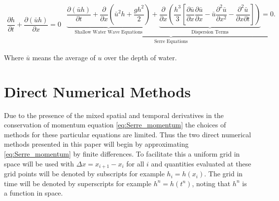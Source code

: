 \documentclass[SingleSpace,12pt,Proceedings]{Serre_ASCE}
\begin{document}
\begin{linenomath*}
\begin{subequations}\label{eq:Serre_nonconservative_form}
\begin{gather}
\dfrac{\partial h}{\partial t} + \dfrac{\partial (\bar{u}h)}{\partial x} = 0
\label{eq:Serre_continuity}
\end{gather}
\begin{gather}
\underbrace{\underbrace{\dfrac{\partial (\bar{u}h)}{\partial t} + \dfrac{\partial}{\partial x} \left ( \bar{u}^2h + \dfrac{gh^2}{2}\right )}_{\text{Shallow Water Wave Equations}} + \underbrace{\dfrac{\partial}{\partial x} \left (  \dfrac{h^3}{3} \left [ \dfrac{\partial \bar{u} }{\partial x} \dfrac{\partial \bar{u}}{\partial x} - \bar{u} \dfrac{\partial^2 \bar{u}}{\partial x^2}  - \dfrac{\partial^2 \bar{u}}{\partial x \partial t}\right ] \right )}_{\text{Dispersion Terms}} = 0.}_{\text{Serre Equations}}
\label{eq:Serre_momentum}
\end{gather}
\end{subequations}
\end{linenomath*}
Where $\bar{u}$ means the average of $u$ over the depth of water.
\section{Direct Numerical Methods}
Due to the presence of the mixed spatial and temporal derivatives in the conservation of momentum equation \eqref{eq:Serre_momentum} the choices of methods for these particular equations are limited. Thus the two direct numerical methods presented in this paper will begin by approximating \eqref{eq:Serre_momentum} by finite differences. To facilitate this a uniform grid in space will be used with $\Delta x  = x_{i+1} - x_i$ for all $i$ and quantities evaluated at these grid points will be denoted by subscripts for example $h_i = h(x_i)$. The grid in time will be denoted by superscripts for example $h^n = h(t^n)$, noting that $h^n$ is a function in space. 
\end{document}
